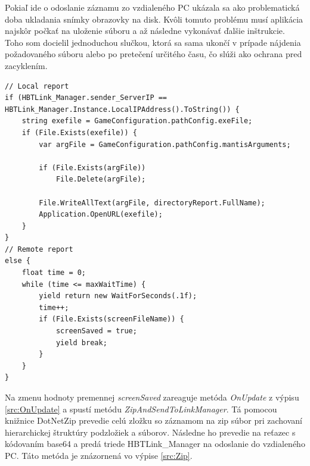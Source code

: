 \documentclass[slovak, bachelorpractice]{diploma}
\begin{document}
Pokiaľ ide o odoslanie záznamu zo vzdialeného PC ukázala sa ako problematická doba ukladania snímky obrazovky na disk. Kvôli tomuto problému musí aplikácia najskôr počkať na uloženie súboru a až následne vykonávať ďalšie inštrukcie. Toho som docielil jednoduchou slučkou, ktorá sa sama ukončí v prípade nájdenia požadovaného súboru alebo po pretečení určitého času, čo slúži ako ochrana pred zacyklením. 

\vspace{10pt}
\begin{lstlisting}[label=src:Report,caption={Vytváranie lokálneho a vzdialeného záznamu o chybe}]
// Local report
if (HBTLink_Manager.sender_ServerIP == HBTLink_Manager.Instance.LocalIPAddress().ToString()) {
    string exefile = GameConfiguration.pathConfig.exeFile;
    if (File.Exists(exefile)) {
        var argFile = GameConfiguration.pathConfig.mantisArguments;

        if (File.Exists(argFile))
            File.Delete(argFile);

        File.WriteAllText(argFile, directoryReport.FullName);
        Application.OpenURL(exefile);
    }
}
// Remote report
else {
    float time = 0;
    while (time <= maxWaitTime) {
        yield return new WaitForSeconds(.1f);
        time++;
        if (File.Exists(screenFileName)) {
            screenSaved = true;
            yield break;
        }
    }
}
\end{lstlisting}

Na zmenu hodnoty premennej \textit{screenSaved} zareaguje metóda \textit{OnUpdate} z výpisu \ref{src:OnUpdate} a spustí metódu \textit{ZipAndSendToLinkManager}. Tá pomocou knižnice DotNetZip \cite{DotNetZip} prevedie celú zložku so záznamom na zip súbor pri zachovaní hierarchickej štruktúry podzložiek a súborov. Následne ho prevedie na reťazec s kódovaním base64 a predá triede HBTLink\_Manager na odoslanie do vzdialeného PC. Táto metóda je znázornená vo výpise \ref{src:Zip}. 
\end{document}
